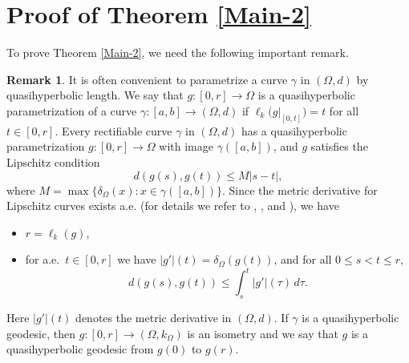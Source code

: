 \documentclass[a4paper,12pt]{amsart}
\theoremstyle{definition}
\newtheorem{rem}{Remark}[section]
\begin{document}
\section{Proof of Theorem \ref{Main-2}}
To prove Theorem \ref{Main-2}, we need the following important remark.
\begin{rem}\label{imp-rem}
	It is often convenient to parametrize a curve $\gamma$ in $(\Omega,d)$ by quasihyperbolic length. We say that $g:[0,r]\to \Omega$ is a quasihyperbolic parametrization of a curve $\gamma:[a,b]\to (\Omega,d)$ if $\ell_k\big(g|_{[0,t]}\big)=t$ for all $t\in [0,r]$. Every rectifiable curve $\gamma$ in $(\Omega,d)$ has a quasihyperbolic parametrization $g:[0,r]\to \Omega$ with image $\gamma([a,b])$, and $g$ satisfies the Lipschitz condition
	$$d(g(s),g(t))\le M|s-t|,$$
	where $M=\max\{\delta_{\Omega}(x):x\in \gamma([a,b])\}$. Since the metric derivative for Lipschitz curves exists a.e. (for details we refer to \cite{Ambrosio-1990}, \cite[p.~2 and p.~24]{Book}, and \cite[Theorem 3.2]{Ambrosio-2000}), we have
	\begin{itemize}
		\item[(i)] $r=\ell_k(g)$,
		\item[(ii)] for a.e.\ $t\in[0,r]$ we have $|g'|(t)=\delta_{\Omega}(g(t))$, and for all $0\le s<t\le r$,
		$$d(g(s),g(t))\le \int_{s}^{t}|g'|(\tau)\,d\tau.$$
	\end{itemize}
	Here $|g'|(t)$ denotes the metric derivative in $(\Omega,d)$. If $\gamma$ is a quasihyperbolic geodesic, then $g:[0,r]\to (\Omega,k_{\Omega})$ is an isometry and we say that $g$ is a quasihyperbolic geodesic from $g(0)$ to $g(r)$.
\end{rem}
\end{document}
